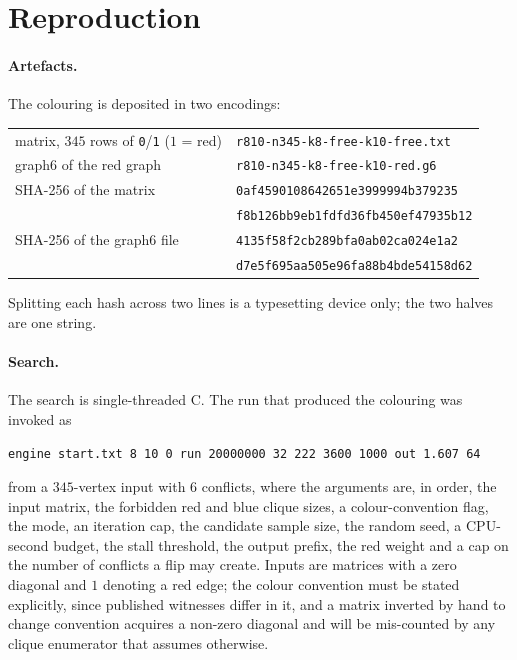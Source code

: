 \documentclass[11pt]{article}
\begin{document}
\section{Reproduction}\label{sec:data}

\paragraph{Artefacts.}
The colouring is deposited in two encodings:
\begin{center}
\small
\begin{tabular}{@{}ll@{}}
\toprule
matrix, $345$ rows of \texttt{0}/\texttt{1} ($1$ = red) & \texttt{r810-n345-k8-free-k10-free.txt}\\
graph6 of the red graph & \texttt{r810-n345-k8-free-k10-red.g6}\\
\midrule
SHA-256 of the matrix & \texttt{0af4590108642651e3999994b379235}\\
 & \texttt{f8b126bb9eb1fdfd36fb450ef47935b12}\\
SHA-256 of the graph6 file & \texttt{4135f58f2cb289bfa0ab02ca024e1a2}\\
 & \texttt{d7e5f695aa505e96fa88b4bde54158d62}\\
\bottomrule
\end{tabular}
\end{center}

Splitting each hash across two lines is a typesetting device only; the two halves are one string.

\paragraph{Search.}
The search is single-threaded C. The run that produced the colouring was invoked as
\begin{center}
\texttt{engine start.txt 8 10 0 run 20000000 32 222 3600 1000 out 1.607 64}
\end{center}
from a $345$-vertex input with $6$ conflicts, where the arguments are, in order, the input matrix, the
forbidden red and blue clique sizes, a colour-convention flag, the mode, an iteration cap, the
candidate sample size, the random seed, a CPU-second budget, the stall threshold, the output prefix,
the red weight and a cap on the number of conflicts a flip may create. Inputs are matrices with a
zero diagonal and $1$ denoting a red edge; the colour convention must be stated explicitly, since
published witnesses differ in it, and a matrix inverted by hand to change convention acquires a
non-zero diagonal and will be mis-counted by any clique enumerator that assumes otherwise.
\end{document}
